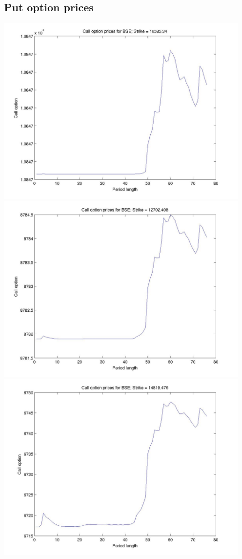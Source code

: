 \documentclass[12pt]{article}
\begin{document}
  \subsection{Put option prices}
    \begin{center}
      \includegraphics[width=5in]{put_strike1.jpg}
      \includegraphics[width=5in]{put_strike2.jpg}
      \includegraphics[width=5in]{put_strike3.jpg}

\end{center}
\end{document}
